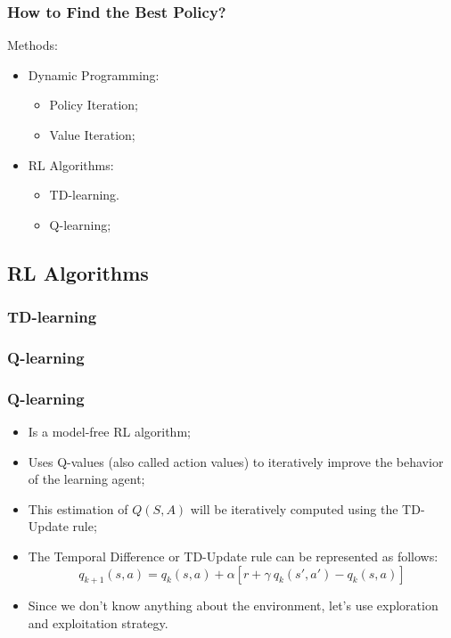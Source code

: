 \begin{frame}
    \frametitle{How to Find the Best Policy?}
    Methods:
    \begin{itemize}
        \item Dynamic Programming:
        \begin{itemize}
            \item Policy Iteration;
            \item Value Iteration;
        \end{itemize}
        
        \item {\color{red}RL Algorithms:}
        \begin{itemize}
            \item TD-learning.
            \item Q-learning;
        \end{itemize}
        
    \end{itemize}
\end{frame} 


\subsection{RL Algorithms}


\subsubsection{TD-learning}
\subsubsection{Q-learning}


\begin{frame}
    \frametitle{Q-learning}
    \begin{itemize}
        \item Is a {\color{red}model-free} RL algorithm;
        \item Uses Q-values (also called action values) to iteratively improve 
        the behavior of the learning agent;
        \item  This estimation of $Q(S,A)$ will be iteratively computed 
        using the TD-Update rule;
        \item The Temporal Difference or TD-Update rule can be represented 
        as follows:
        $$q_{k+1}(s,a) = q_{k}(s,a) + \alpha[r+\gamma~q_{k}(s',a') - q_{k}(s,a)]$$
        \item Since we don't know anything about the environment, let's use exploration and 
        exploitation strategy.
    \end{itemize}
\end{frame}

